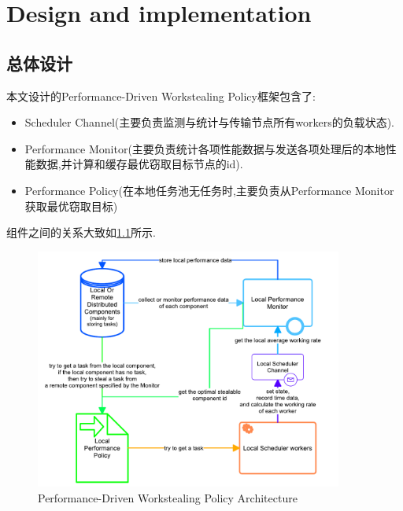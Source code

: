 \documentclass{mproj}
\begin{document}
\chapter{Design and implementation}\label{design}

\section{总体设计}

本文设计的Performance-Driven Workstealing Policy框架包含了:
\begin{itemize}
    \item Scheduler Channel(主要负责监测与统计与传输节点所有workers的负载状态).
    \item Performance Monitor(主要负责统计各项性能数据与发送各项处理后的本地性能数据,并计算和缓存最优窃取目标节点的id).
    \item Performance Policy(在本地任务池无任务时,主要负责从Performance Monitor获取最优窃取目标)
\end{itemize}

组件之间的关系大致如\cref{fig:overall_architecture}所示.
\begin{figure}[h] %
    \centering %
    \includegraphics[width=0.9\textwidth]{images/overall_architecture.pdf} %
    \caption{Performance-Driven Workstealing Policy Architecture} %
    \label{fig:overall_architecture} %
\end{figure}
\FloatBarrier
\end{document}
